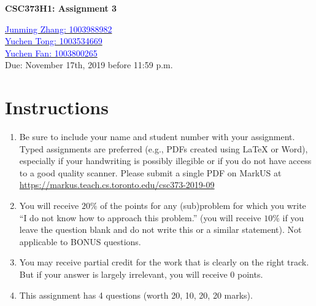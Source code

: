 \documentclass[10pt]{article}
\begin{document}
\begin{center}
\Large \textbf{CSC373H1: Assignment 3}

\vspace{1mm}
\large {\href{mailto:junmingpeter.zhang@mail.utoronto.ca?Subject=CSC373H1: Assignment 3}{\textcolor{blue}{Junming Zhang: 1003988982}}\\
        \href{mailto:yuchen.tong@mail.utoronto.ca?Subject=CSC373H1: Assignment 3}{\textcolor{blue}{Yuchen Tong: 1003534669}}\\
        \href{mailto:yuchen.fan@mail.utoronto.ca?Subject=CSC373H1: Assignment 3}{\textcolor{blue}{Yuchen Fan: 1003800265}}}\\

\vspace{1mm}
\large {Due: November 17th, 2019 before 11:59 p.m.}
\end{center}
\section*{Instructions}
\begin{enumerate}
    \item Be sure to include your name and student number with your assignment. Typed assignments are preferred (e.g., PDFs created using LaTeX or Word), especially if your handwriting is possibly illegible or if you do not have access to a good quality scanner. Please submit a single PDF on MarkUS at \url{https://markus.teach.cs.toronto.edu/csc373-2019-09}
    \item You will receive $20\%$ of the points for any (sub)problem for which you write “I do not know how to approach this problem.” (you will receive $10\%$ if you leave the question blank and do not write this or a similar statement). Not applicable to BONUS questions.
    \item You may receive partial credit for the work that is clearly on the right track. But if your answer is largely irrelevant, you will receive 0 points.
    \item This assignment has 4 questions  (worth 20, 10, 20, 20 marks).
\end{enumerate}
\end{document}
